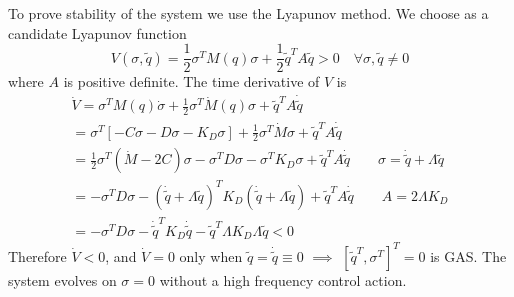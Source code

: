 \documentclass{book}
\begin{document}
To prove stability of the system we use the Lyapunov method. We choose as a candidate Lyapunov function 
\[
    V(\sigma,\tilde{q}) = \displaystyle\frac{1}{2}\sigma^TM(q)\sigma+\displaystyle\frac{1}{2}\tilde{q}^TA\tilde{q}>0 \quad \forall \sigma,\tilde{q} \neq 0 
\]
where $A$ is positive definite.
The time derivative of $V$ is 
\begin{gather*}
    \dot{V}=\sigma^TM(q)\dot{\sigma}+\displaystyle\frac{1}{2}\sigma^T\dot{M}(q)\sigma+\tilde{q}^TA\dot{\tilde{q}}\\
    =\sigma^T[-C\sigma-D\sigma-K_D\sigma]+\displaystyle\frac{1}{2}\sigma^T\dot{M}\sigma+\tilde{q}^TA\dot{\tilde{q}}\\
    =\displaystyle\frac{1}{2}\sigma^T(\dot{M}-2C)\sigma-\sigma^TD\sigma-\sigma^TK_D\sigma+\tilde{q}^TA\dot{\tilde{q}} \qquad \sigma=\dot{\tilde{q}}+\Lambda\tilde{q} \\
    =-\sigma^TD\sigma-(\dot{\tilde{q}}+\Lambda\tilde{q})^TK_D(\dot{\tilde{q}}+\Lambda\tilde{q})+\tilde{q}^TA\dot{\tilde{q}} \qquad A=2\Lambda K_D\\
    =-\sigma^TD\sigma-\dot{\tilde{q}}^TK_D\dot{\tilde{q}}-\tilde{q}^T\Lambda K_D \Lambda \tilde{q}<0
\end{gather*}
Therefore $\dot{V}<0$, and $\dot{V}=0$ only when $\tilde{q}=\dot{\tilde{q}}\equiv 0$ $\implies$ $[\tilde{q}^T,\sigma^T]^T=0$ is GAS. The system evolves on $\sigma=0$ without a high frequency control action.
\end{document}
